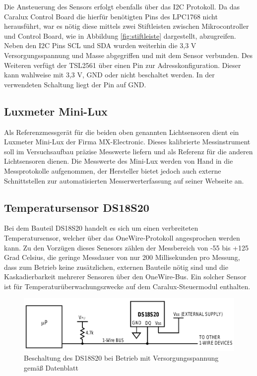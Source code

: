 \documentclass[a4paper,12pt]{scrartcl}
\begin{document}
Die Ansteuerung des Sensors erfolgt ebenfalls über das I2C Protokoll. Da das Caralux Control Board die hierfür benötigten Pins des LPC1768 nicht herausführt, war es nötig diese mittels zwei Stiftleisten zwischen Mikrocontroller und Control Board, wie in Abbildung \ref{fig:stiftleiste} dargestellt, abzugreifen. Neben den I2C Pins SCL und SDA wurden weiterhin die 3,3 V Versorgungsspannung und Masse abgegriffen und mit dem Sensor verbunden. Des Weiteren verfügt der TSL2561 über einen Pin zur Adresskonfiguration. Dieser kann wahlweise mit 3,3 V, GND oder nicht beschaltet werden. In der verwendeten Schaltung liegt der Pin auf GND.

\subsection{Luxmeter Mini-Lux}
Als Referenzmessgerät für die beiden oben genannten Lichtsensoren dient ein Luxmeter Mini-Lux der Firma MX-Electronic. Dieses kalibrierte Messinstrument soll
im Versuchsaufbau präzise Messwerte liefern und als Referenz für die anderen Lichtsensoren dienen. Die Messwerte des Mini-Lux werden von Hand in die
Messprotokolle aufgenommen, der Hersteller bietet jedoch auch externe Schnittstellen zur automatisierten Messerwerterfassung auf seiner Webseite an.\cite{specminilux}

\subsection{Temperatursensor DS18S20}
Bei dem Bauteil DS18S20 handelt es sich um einen verbreiteten Temperatursensor, welcher über das OneWire-Protokoll angesprochen werden kann. Zu den Vorzügen dieses Senesors zählen der Messbereich von -55 bis +125 Grad Celsius, die
geringe Messdauer von nur 200 Millisekunden pro Messung, dass zum Betrieb keine zusätzlichen, externen Bauteile nötig sind und die Kaskadierbarkeit mehrerer Sensoren über den OneWire-Bus.\cite{specds1820} Ein solcher Sensor ist für Temperaturüberwachungszwecke auf dem Caralux-Steuermodul enthalten.

\begin{figure}[htb]
\begin{center}
\includegraphics[width=0.8\hsize]{./images/schaltung-ds18s20.png}
\end{center}
\caption{\label{fig:schaltungDs18s20}Beschaltung des DS18S20 bei Betrieb mit Versorgungsspannung gemäß Datenblatt \cite{specds1820}}
\end{figure}
\end{document}
